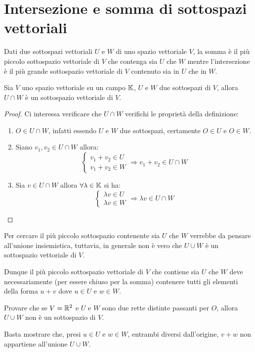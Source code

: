 \section{Intersezione e somma di sottospazi vettoriali}
Dati due sottospazi vettoriali $U$ e $W$ di uno spazio vettoriale $V$, la somma è il più piccolo sottospazio
vettoriale di $V$ che contenga sia $U$ che $W$ mentre l'intersezione è il più grande sottospazio vettoriale
di $V$ contenuto sia in $U$ che in $W$.

\begin{proposition}
	Sia $V$ uno spazio vettoriale su un campo $\mathbb{K}$, $U$ e $W$ due sottospazi di $V$, allora $U \cap W$
	è un sottospazio vettoriale di $V$.
	\begin{proof}
		Ci interessa verificare che $U \cap W$ verifichi le proprietà della definizione:
		\begin{enumerate}
			\item $O \in U \cap W$, infatti essendo $U$ e $W$ due sottospazi, certamente $O \in U$ e $O \in W$.
			\item Siano $v_1, v_2 \in U \cap W$ allora:
			      \[
				      \begin{cases}
					      v_1 + v_2 \in U \\
					      v_1 + v_2 \in W
				      \end{cases}
				      \Rightarrow{v_1 + v_2 \in U \cap W}
			      \]
			\item Sia $v \in U \cap W$ allora $\forall \lambda \in \mathbb{K}$ si ha:
			      \[
				      \begin{cases}
					      \lambda v \in U \\
					      \lambda v \in W
				      \end{cases}
				      \Rightarrow{\lambda v \in U \cap W}
			      \]
		\end{enumerate}
	\end{proof}
\end{proposition}

Per cercare il più piccolo sottospazio contenente sia $U$ che $W$ verrebbe da pensare all'unione insiemistica,
tuttavia, in generale non è vero che $U \cup W$ è un sottospazio vettoriale di $V$.

Dunque il più piccolo sottospazio vettoriale di $V$ che contiene sia $U$ che $W$ deve necessariamente (per
essere chiuso per la somma) contenere tutti gli elementi della forma $u + v$ dove $u \in U$ e $w \in W$.

\begin{example}
	Provare che se $V = \mathbb{R}^2$ e $U$ e $W$ sono due rette distinte passanti per $O$, allora $U \cup W$
	non è un sottospazio di $V$.

	Basta mostrare che, presi $u \in U$ e $w \in W$, entrambi diversi dall'origine, $v + w$ non appartiene
	all'unione $U \cup W$.
\end{example}

